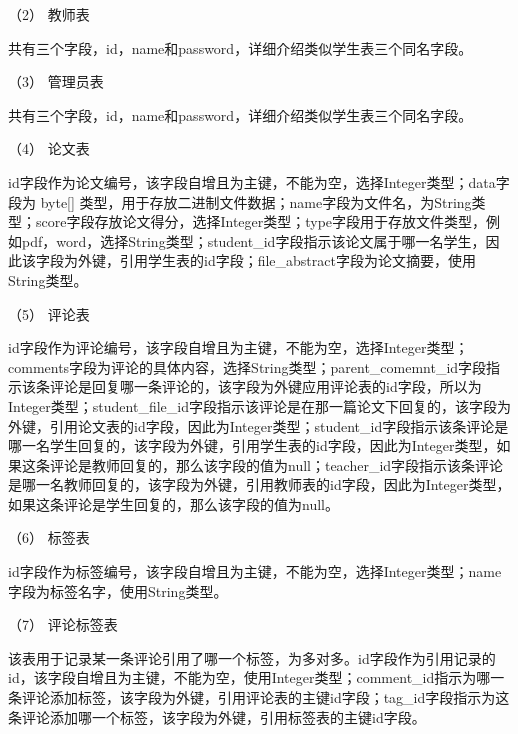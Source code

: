 （2） 教师表

共有三个字段，id，name和password，详细介绍类似学生表三个同名字段。

（3） 管理员表

共有三个字段，id，name和password，详细介绍类似学生表三个同名字段。

（4） 论文表

id字段作为论文编号，该字段自增且为主键，不能为空，选择Integer类型；data字段为 byte[] 类型，用于存放二进制文件数据；name字段为文件名，为String类型；score字段存放论文得分，选择Integer类型；type字段用于存放文件类型，例如pdf，word，选择String类型；student\_id字段指示该论文属于哪一名学生，因此该字段为外键，引用学生表的id字段；file\_abstract字段为论文摘要，使用String类型。

（5） 评论表

id字段作为评论编号，该字段自增且为主键，不能为空，选择Integer类型；comments字段为评论的具体内容，选择String类型；parent\_comemnt\_id字段指示该条评论是回复哪一条评论的，该字段为外键应用评论表的id字段，所以为Integer类型；student\_file\_id字段指示该评论是在那一篇论文下回复的，该字段为外键，引用论文表的id字段，因此为Integer类型；student\_id字段指示该条评论是哪一名学生回复的，该字段为外键，引用学生表的id字段，因此为Integer类型，如果这条评论是教师回复的，那么该字段的值为null；teacher\_id字段指示该条评论是哪一名教师回复的，该字段为外键，引用教师表的id字段，因此为Integer类型，如果这条评论是学生回复的，那么该字段的值为null。

（6） 标签表

id字段作为标签编号，该字段自增且为主键，不能为空，选择Integer类型；name字段为标签名字，使用String类型。

（7） 评论标签表

该表用于记录某一条评论引用了哪一个标签，为多对多。id字段作为引用记录的id，该字段自增且为主键，不能为空，使用Integer类型；comment\_id指示为哪一条评论添加标签，该字段为外键，引用评论表的主键id字段；tag\_id字段指示为这条评论添加哪一个标签，该字段为外键，引用标签表的主键id字段。

